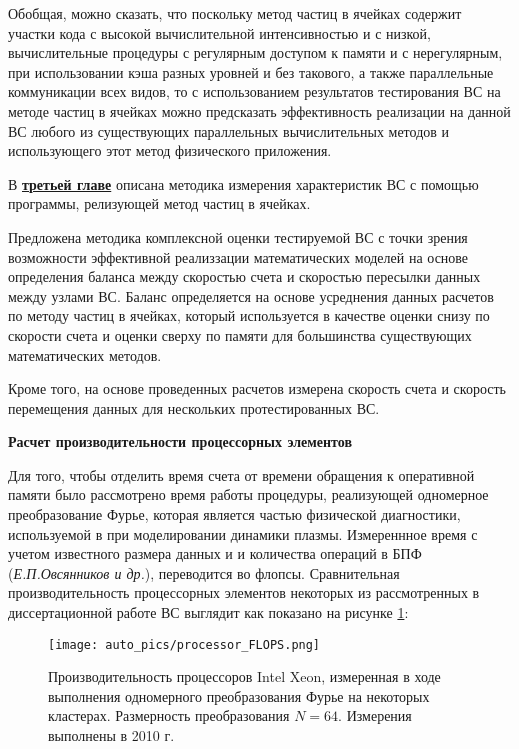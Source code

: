 Обобщая, можно сказать, что поскольку метод частиц в ячейках содержит участки кода с высокой вычислительной интенсивностью и с низкой, вычислительные процедуры с регулярным доступом к памяти и с нерегулярным, при использовании кэша разных уровней и без такового, а также параллельные коммуникации всех видов, то с использованием результатов тестирования ВС на методе частиц в ячейках можно предсказать эффективность реализации на данной ВС любого из существующих параллельных вычислительных методов и использующего этот метод физического приложения.

В \underline{\textbf{третьей главе}} описана методика измерения характеристик ВС с помощью программы, релизующей метод частиц в ячейках. 

Предложена методика комплексной оценки тестируемой ВС с точки зрения возможности эффективной реализзации математических моделей на основе определения баланса между скоростью счета и скоростью пересылки данных между узлами ВС. Баланс определяется на основе усреднения данных расчетов по методу частиц в ячейках, который используется в качестве оценки снизу по скорости счета и оценки сверху по памяти для большинства существующих математических методов.

Кроме того, на основе проведенных расчетов измерена скорость счета и скорость перемещения данных для нескольких протестированных ВС.   

\textbf{Расчет производительности процессорных элементов}

Для того, чтобы отделить время счета от времени обращения к оперативной памяти было рассмотрено время работы процедуры,
реализующей одномерное преобразование Фурье, которая является частью физической диагностики, используемой в при моделировании динамики плазмы. Измереннное время с учетом известного размера данных и и количества операций в БПФ (\textit{Е.П.Овсянников и др.}), переводится во флопсы. Сравнительная производительность процессорных элементов некоторых из рассмотренных в диссертационной работе ВС выглядит как показано на рисунке  \ref{procs_flops}:

\begin{figure}[htb]
	\begin{center}
		\texttt{[image: auto\_pics/processor\_FLOPS.png]}
	\end{center}
	\caption{Производительность процессоров Intel Xeon, измеренная в ходе выполнения одномерного преобразования Фурье на некоторых кластерах. Размерность преобразования $N=64$. Измерения выполнены в 2010 г.}
	\label{procs_flops}
\end{figure} 


